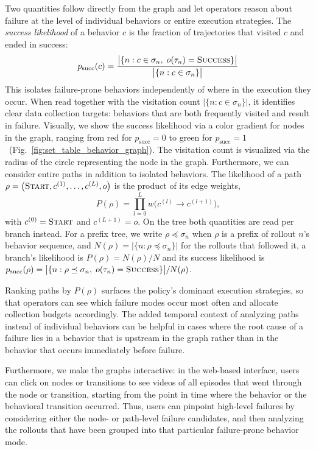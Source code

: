 \documentclass[letterpaper, 10 pt, conference]{ieeeconf}
\newcommand{\successnode}{\textsc{Success}}
\newcommand{\rollout}{\tau}
\begin{document}
Two quantities follow directly from the graph and let operators reason about failure at the level of individual behaviors or entire execution strategies. The \emph{success likelihood} of a behavior \(c\) is the fraction of trajectories that visited \(c\) and ended in success:
\begin{equation}
  p_\text{succ}(c) = \frac{\bigl|\{n : c \in \sigma_n,\; o(\rollout_n) = \successnode\}\bigr|}{\bigl|\{n : c \in \sigma_n\}\bigr|}
  \label{eq:psucc}
\end{equation}
This isolates failure-prone behaviors independently of where in the execution they occur. When read together with the visitation count \(\bigl|\{n : c \in \sigma_n\}\bigr|\), it identifies clear data collection targets: behaviors that are both frequently visited and result in failure. Visually, we show the success likelihood via a color gradient for nodes in the graph, ranging from red for \(p_\text{succ} = 0\) to green for \(p_\text{succ} = 1\)~(Fig.~\ref{fig:set_table_behavior_graph}). The visitation count is visualized via the radius of the circle representing the node in the graph. Furthermore, we can consider entire paths in addition to isolated behaviors. The likelihood of a path \(\rho = \bigl(\textsc{Start}, c^{(1)}, \ldots, c^{(L)}, o\bigr)\) is the product of its edge weights,
\begin{equation}
  P(\rho) = \prod_{l=0}^{L} w\bigl(c^{(l)} \to c^{(l+1)}\bigr),
  \label{eq:pathprob}
\end{equation}
with \(c^{(0)} = \textsc{Start}\) and \(c^{(L+1)} = o\). On the tree both quantities are read per branch instead. For a prefix tree, we write \(\rho \preceq \sigma_n\) when \(\rho\) is a prefix of rollout \(n\)'s behavior sequence, and \(N(\rho) = \bigl|\{n : \rho \preceq \sigma_n\}\bigr|\) for the rollouts that followed it, a branch's likelihood is \(P(\rho) = N(\rho)/N\) and its success likelihood is \(p_\text{succ}(\rho) = \bigl|\{n : \rho \preceq \sigma_n,\; o(\rollout_n) = \successnode\}\bigr| / N(\rho)\). 

Ranking paths by \(P(\rho)\) surfaces the policy's dominant execution strategies, so that operators can see which failure modes occur most often and allocate collection budgets accordingly. The added temporal context of analyzing paths instead of individual behaviors can be helpful in cases where the root cause of a failure lies in a behavior that is upstream in the graph rather than in the behavior that occurs immediately before failure.

Furthermore, we make the graphs interactive: in the web-based interface, users can click on nodes or transitions to see videos of all episodes that went through the node or transition, starting from the point in time where the behavior or the behavioral transition occurred. Thus, users can pinpoint high-level failures by considering either the node- or path-level failure candidates, and then analyzing the rollouts that have been grouped into that particular failure-prone behavior mode.
 
\end{document}
